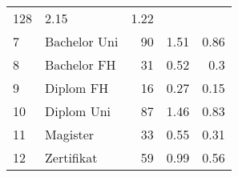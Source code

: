 \begin{longtable}{lXrrr}
       \num{128} &
       \num[round-mode=places,round-precision=2]{2.15} &
         \num[round-mode=places,round-precision=2]{1.22} \\

     7 &
     \multicolumn{1}{X}{ Bachelor Uni   } &


       \num{90} &
       \num[round-mode=places,round-precision=2]{1.51} &
         \num[round-mode=places,round-precision=2]{0.86} \\

     8 &
     \multicolumn{1}{X}{ Bachelor FH   } &


       \num{31} &
       \num[round-mode=places,round-precision=2]{0.52} &
         \num[round-mode=places,round-precision=2]{0.3} \\

     9 &
     \multicolumn{1}{X}{ Diplom FH   } &


       \num{16} &
       \num[round-mode=places,round-precision=2]{0.27} &
         \num[round-mode=places,round-precision=2]{0.15} \\

     10 &
     \multicolumn{1}{X}{ Diplom Uni   } &


       \num{87} &
       \num[round-mode=places,round-precision=2]{1.46} &
         \num[round-mode=places,round-precision=2]{0.83} \\

     11 &
     \multicolumn{1}{X}{ Magister   } &


       \num{33} &
       \num[round-mode=places,round-precision=2]{0.55} &
         \num[round-mode=places,round-precision=2]{0.31} \\

     12 &
     \multicolumn{1}{X}{ Zertifikat   } &


       \num{59} &
       \num[round-mode=places,round-precision=2]{0.99} &
         \num[round-mode=places,round-precision=2]{0.56} \\


\end{longtable}
